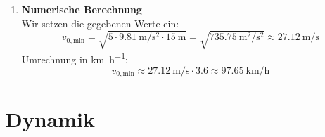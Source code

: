 \documentclass[ngerman]{scrreprt}
\newenvironment{loesungbox}[1]
  {\needspace{5\baselineskip}\begin{loesungboxstyle}[frametitle={#1}]}
  {\end{loesungboxstyle}}
\begin{document}
\begin{loesungbox}{Lösung zu \Cref{aufg:looping_geschwindigkeit}}
\begin{enumerate}
    \item \textbf{Numerische Berechnung} \\
    Wir setzen die gegebenen Werte ein:
    \begin{equation}\label{eq: v0_min_looping_ms}
        v_{0,\text{min}} = \sqrt{5 \cdot \SI{9.81}{\meter\per\second\squared} \cdot \SI{15}{\meter}} = \sqrt{\SI{735.75}{\square\meter\per\square\second}} \approx \SI{27.12}{\meter\per\second}
    \end{equation}
    Umrechnung in \si{\kilo\meter\per\hour}:
    \begin{equation}\label{eq: v0_min_looping_kmh}
        v_{0,\text{min}} \approx \SI{27.12}{\meter\per\second} \cdot \num{3.6} \approx \SI{97.65}{\kilo\meter\per\hour}
    \end{equation}
\end{enumerate}
\end{loesungbox}




\chapter{Dynamik}
\end{document}
